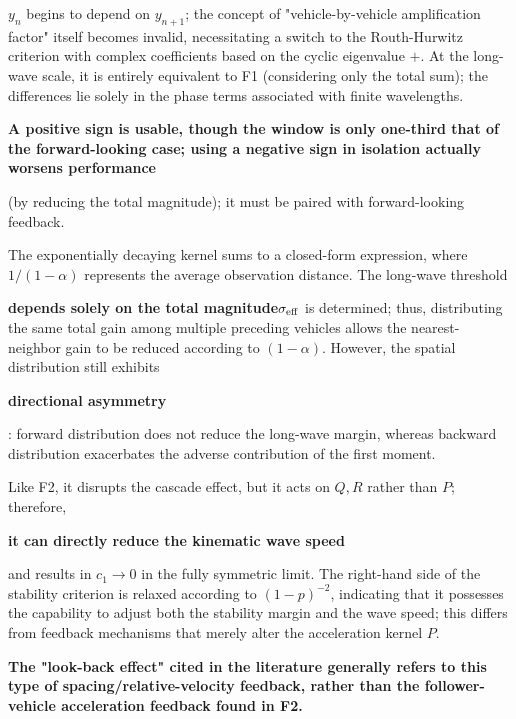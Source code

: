 \documentclass[11pt,a4paper,openany]{book}
\numberwithin{equation}{chapter}
\numberwithin{figure}{chapter}
\numberwithin{table}{chapter}
\begin{document}
\begin{tcolorbox}[keybox,title=\textbf{F2 Acceleration feedback from the following vehicle (first instance of cascade disruption)}]
$y_n$ begins to depend on $y_{n+1}$; the concept of "vehicle-by-vehicle amplification factor" itself becomes invalid, necessitating a switch to the Routh-Hurwitz criterion with complex coefficients based on the cyclic eigenvalue $+$. At the long-wave scale, it is entirely equivalent to F1 (considering only the total sum); the differences lie solely in the phase terms associated with finite wavelengths.

\textbf{A positive sign is usable, though the window is only one-third that of the forward-looking case; using a negative sign in isolation actually worsens performance}

(by reducing the total magnitude); it must be paired with forward-looking feedback.


\end{tcolorbox}

\begin{tcolorbox}[keybox,title=\textbf{F3 Multi-vehicle feedback (diluting the gain)}]
The exponentially decaying kernel sums to a closed-form expression, where $1/(1-\alpha)$ represents the average observation distance. The long-wave threshold

\textbf{depends solely on the total magnitude}$\sigma_{\rm eff}$ is determined; thus, distributing the same total gain among multiple preceding vehicles allows the nearest-neighbor gain to be reduced according to $(1-\alpha)$. However, the spatial distribution still exhibits

\textbf{directional asymmetry}

: forward distribution does not reduce the long-wave margin, whereas backward distribution exacerbates the adverse contribution of the first moment.


\end{tcolorbox}

\begin{tcolorbox}[keybox,title=\textbf{F4 Backward spacing feedback (the only factor capable of altering wave speed)}]
Like F2, it disrupts the cascade effect, but it acts on $Q,R$ rather than $P$; therefore,

\textbf{it can directly reduce the kinematic wave speed}

and results in $c_1\to0$ in the fully symmetric limit. The right-hand side of the stability criterion is relaxed according to $(1-p)^{-2}$, indicating that it possesses the capability to adjust both the stability margin and the wave speed; this differs from feedback mechanisms that merely alter the acceleration kernel $P$.

\textbf{The "look-back effect" cited in the literature generally refers to this type of spacing/relative-velocity feedback, rather than the follower-vehicle acceleration feedback found in F2.}
\end{tcolorbox}
\end{document}
